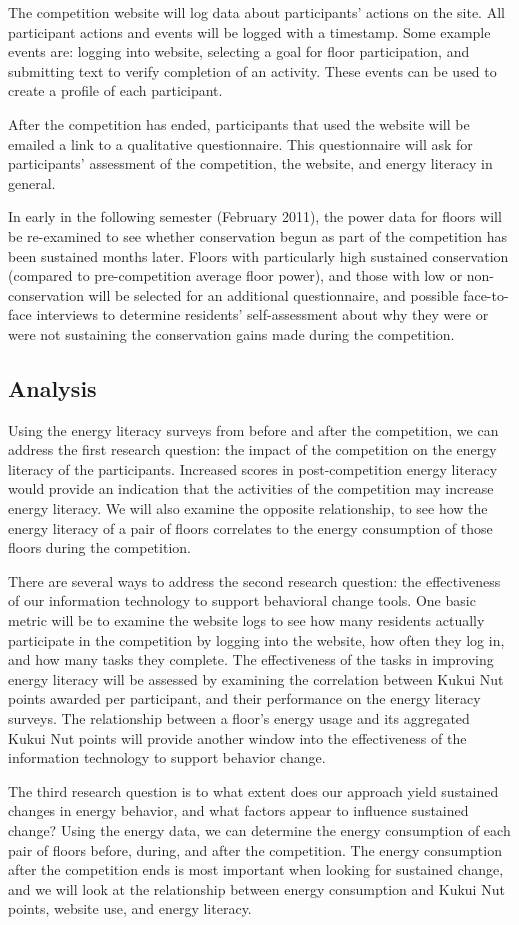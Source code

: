 The competition website will log data about participants' actions on the site. All participant actions and events will be logged with a timestamp. Some example events are: logging into website, selecting a goal for floor participation, and submitting text to verify completion of an activity. These events can be used to create a profile of each participant.

After the competition has ended, participants that used the website will be emailed a link to a qualitative questionnaire. This questionnaire will ask for participants' assessment of the competition, the website, and energy literacy in general.

In early in the following semester (February 2011), the power data for floors will be re-examined to see whether conservation begun as part of the competition has been sustained months later. Floors with particularly high sustained conservation (compared to pre-competition average floor power), and those with low or non-conservation will be selected for an additional questionnaire, and possible face-to-face interviews to determine residents' self-assessment about why they were or were not sustaining the conservation gains made during the competition.

\subsection{Analysis}

Using the energy literacy surveys from before and after the competition, we can 
address the first research question: the impact of the competition on the energy literacy of the participants. Increased scores in post-competition energy literacy would provide an indication that the activities of the competition may increase energy literacy. We will also examine the opposite relationship, to see how the energy literacy of a pair of floors correlates to the energy consumption of those floors during the competition.

There are several ways to address the second research question: the effectiveness of our information technology to support behavioral change tools. One basic metric will be to examine the website logs to see how many residents actually participate in the competition by logging into the website, how often they log in, and how many tasks they complete. The effectiveness of the tasks in improving energy literacy will be assessed by examining the correlation between Kukui Nut points awarded per participant, and their performance on the energy literacy surveys. The relationship between a floor's energy usage and its aggregated Kukui Nut points will provide another window into the effectiveness of the information technology to support behavior change.

The third research question is to what extent does our approach yield sustained changes in energy behavior, and what factors appear to influence sustained change? Using the energy data, we can determine the energy consumption of each pair of floors before, during, and after the competition. The energy consumption after the competition ends is most important when looking for sustained change, and we will look at the relationship between energy consumption and Kukui Nut points, website use, and energy literacy.